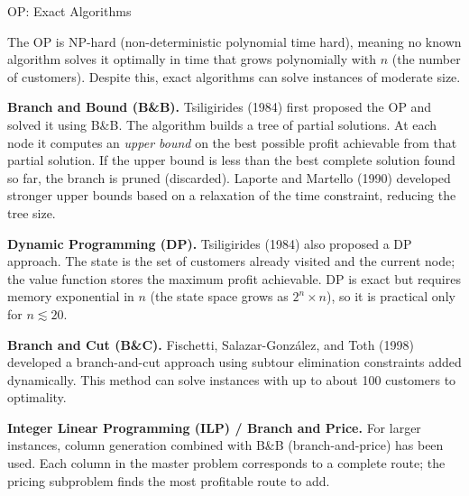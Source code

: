 \documentclass[aspectratio=169,10pt]{beamer}
\begin{document}
\begin{frame}[allowframebreaks]{OP: Exact Algorithms}

  The OP is NP-hard (non-deterministic polynomial time hard), meaning no
  known algorithm solves it optimally in time that grows polynomially
  with $n$ (the number of customers).
  Despite this, exact algorithms can solve instances of moderate size.

  \medskip
  \textbf{Branch and Bound (B\&B).}
  Tsiligirides (1984) first proposed the OP and solved it using B\&B.
  The algorithm builds a tree of partial solutions.
  At each node it computes an \emph{upper bound} on the best possible
  profit achievable from that partial solution.
  If the upper bound is less than the best complete solution found so far,
  the branch is pruned (discarded).
  Laporte and Martello (1990) developed stronger upper bounds
  based on a relaxation of the time constraint, reducing the tree size.

  \medskip
  \textbf{Dynamic Programming (DP).}
  Tsiligirides (1984) also proposed a DP approach.
  The state is the set of customers already visited and the current
  node; the value function stores the maximum profit achievable.
  DP is exact but requires memory exponential in $n$ (the state space
  grows as $2^n \times n$), so it is practical only for $n \lesssim 20$.

  \medskip
  \textbf{Branch and Cut (B\&C).}
  Fischetti, Salazar-Gonz\'alez, and Toth (1998) developed a
  branch-and-cut approach using subtour elimination constraints added
  dynamically.
  This method can solve instances with up to about 100 customers
  to optimality.

  \medskip
  \textbf{Integer Linear Programming (ILP) / Branch and Price.}
  For larger instances, column generation combined with B\&B
  (branch-and-price) has been used.
  Each column in the master problem corresponds to a complete route;
  the pricing subproblem finds the most profitable route to add.

\end{frame}
\end{document}

